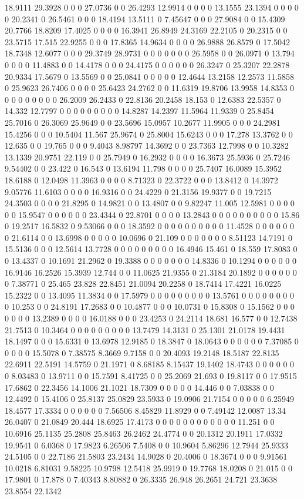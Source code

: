 18.9111 29.3928 0 0 0 27.0736 0 0 26.4293 12.9914 0 0 0 0 13.1555 23.1394 0 0 0 0 0 20.2341 0 26.5461 0 0 0 18.4194 13.5111 0 7.45647 0 0 0 27.9084 0 0 15.4309 20.7766 18.8209 17.4025 0 0 0 0 16.3941 26.8949 24.3169 22.2105 0 20.2315 0 0 23.5715 17.515 22.9255 0 0 0 17.8365 14.9634 0 0 0 0 26.9888 26.8579 0 17.5042 18.7348 12.6077 0 0 0 29.3749 28.9731 0 0 0 0 0 0 0 26.5958 0 0 26.0971 0 13.794 0 0 0 0 11.4883 0 0 14.4178 0 0 0 24.4175 0 0 0 0 0 0 26.3247 0 25.3207 22.2878 20.9334 17.5679 0 13.5569 0 0 25.0841 0 0 0 0 0 12.4644 13.2158 12.2573 11.5858 0 25.9623 26.7406 0 0 0 0 25.6423 24.2762 0 0 11.6319 19.8706 13.9958 14.8353 0 0 0 0 0 0 0 0 0 26.2009 26.2433 0 22.8136 20.2458 18.153 0 12.6383 22.5357 0 14.332 12.7797 0 0 0 0 0 0 0 0 0 14.8287 14.2397 11.5964 11.9339 0 25.8454 25.7016 0 26.3069 25.9649 0 0 23.5696 15.0957 10.2677 11.9905 0 0 0 24.2981 15.4256 0 0 0 10.5404 11.567 25.9674 0 25.8004 15.6243 0 0 0 17.278 13.3762 0 0 12.635 0 0 19.765 0 0 0 9.4043 8.98797 14.3692 0 0 23.7363 12.7998 0 0 10.3282 13.1339 20.9751 22.119 0 0 25.7949 0 16.2932 0 0 0 0 16.3673 25.5936 0 25.7246 9.54402 0 0 23.422 0 16.543 0 13.6194 11.798 0 0 0 0 25.7407 16.0089 15.3952 18.6188 0 12.0498 11.3963 0 0 0 0 8.71323 0 22.3722 0 0 0 13.8412 0 14.3972 9.05776 11.6103 0 0 0 0 16.9316 0 0 24.4229 0 21.3156 19.9377 0 0 19.7215 24.3503 0 0 0 0 21.8295 0 14.9821 0 0 13.4807 0 0 9.82247 11.005 12.5981 0 0 0 0 0 0 15.9547 0 0 0 0 0 0 23.4344 0 22.8701 0 0 0 0 13.2843 0 0 0 0 0 0 0 0 0 0 15.86 0 19.2517 16.5832 0 9.53066 0 0 0 18.3592 0 0 0 0 0 0 0 0 0 0 11.4528 0 0 0 0 0 0 0 21.6114 0 0 13.6998 0 0 0 0 0 10.0696 0 21.109 0 0 0 0 0 0 0 8.51123 14.7191 0 15.5136 0 0 0 12.5614 13.7728 0 0 0 0 0 0 0 0 0 16.4946 15.461 0 18.559 17.8083 0 0 13.4337 0 10.1691 21.2962 0 19.3388 0 0 0 0 0 0 0 14.8336 0 10.1294 0 0 0 0 0 0 16.9146 16.2526 15.3939 12.744 0 0 11.0625 21.9355 0 21.3184 20.1892 0 0 0 0 0 0 0 7.38771 0 25.465 23.828 22.8451 21.0094 20.2258 0 18.7414 17.4221 16.0225 15.2322 0 0 13.4095 11.3834 0 0 17.5979 0 0 0 0 0 0 0 0 0 13.5761 0 0 0 0 0 0 0 0 0 10.253 0 0 24.8191 17.2683 0 0 10.4877 0 0 0 10.0731 0 15.8308 0 15.1562 0 0 0 0 0 0 0 13.2389 0 0 0 0 16.0188 0 0 0 23.4253 0 24.2114 18.681 16.577 0 0 12.7438 21.7513 0 10.3464 0 0 0 0 0 0 0 0 0 13.7479 14.3131 0 25.1301 21.0178 19.4431 18.1497 0 0 0 15.6331 0 13.6978 12.9185 0 18.3847 0 18.0643 0 0 0 0 0 0 7.37085 0 0 0 0 0 15.5078 0 7.38575 8.3669 9.7158 0 0 20.4093 19.2148 18.5187 22.8135 22.6911 22.5191 14.5759 0 21.1971 0 8.68185 8.15437 19.1402 18.4743 0 0 0 0 0 0 0 8.03483 0 13.9711 0 0 15.7591 8.41725 0 0 25.2069 21.693 0 19.8117 0 0 17.9515 17.6862 0 22.3456 14.1006 21.1021 18.7309 0 0 0 0 0 14.446 0 0 7.03838 0 0 12.4492 0 15.4106 0 25.8137 25.0829 23.5933 0 19.0906 21.7154 0 0 0 0 0 6.25949 18.4577 17.3334 0 0 0 0 0 0 7.56506 8.45829 11.8929 0 0 7.49142 12.0087 13.34 26.0407 0 21.0849 20.444 18.6925 17.4173 0 0 0 0 0 0 0 0 0 0 0 0 11.251 0 0 10.6916 25.1135 25.2808 25.8463 26.2462 24.4774 0 0 20.1312 20.1911 17.0332 19.9541 0 6.0368 0 17.9823 6.26506 7.5408 0 0 10.9604 5.86296 12.7944 25.9333 24.5105 0 0 22.7186 21.5803 23.2434 14.9028 0 20.4006 0 18.3674 0 0 0 9.91561 10.0218 6.81031 9.58225 10.9798 12.5418 25.9919 0 19.7768 18.0208 0 21.015 0 0 17.9801 0 17.878 0 7.40343 8.80882 0 26.3335 26.948 26.2651 24.721 23.3638 23.8554 22.1342 
